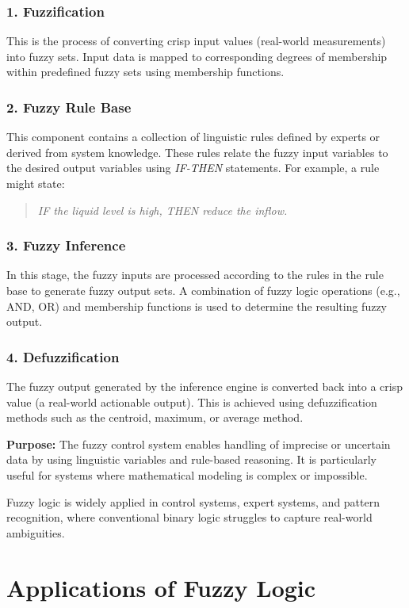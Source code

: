 \documentclass[a4paper,12pt]{report}
\begin{document}
\subsection*{1. Fuzzification}
This is the process of converting crisp input values (real-world measurements) into fuzzy sets. Input data is mapped to corresponding degrees of membership within predefined fuzzy sets using membership functions.

\subsection*{2. Fuzzy Rule Base}
This component contains a collection of linguistic rules defined by experts or derived from system knowledge. These rules relate the fuzzy input variables to the desired output variables using \textit{IF-THEN} statements. For example, a rule might state: 
\begin{quote}
    \textit{IF the liquid level is high, THEN reduce the inflow.}
\end{quote}

\subsection*{3. Fuzzy Inference}
In this stage, the fuzzy inputs are processed according to the rules in the rule base to generate fuzzy output sets. A combination of fuzzy logic operations (e.g., AND, OR) and membership functions is used to determine the resulting fuzzy output.

\subsection*{4. Defuzzification}
The fuzzy output generated by the inference engine is converted back into a crisp value (a real-world actionable output). This is achieved using defuzzification methods such as the centroid, maximum, or average method.

\textbf{Purpose:} The fuzzy control system enables handling of imprecise or uncertain data by using linguistic variables and rule-based reasoning. It is particularly useful for systems where mathematical modeling is complex or impossible.

Fuzzy logic is widely applied in control systems, expert systems, and pattern recognition, where conventional binary logic struggles to capture real-world ambiguities.



\chapter{Applications of Fuzzy Logic}
\end{document}
